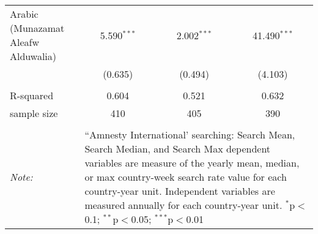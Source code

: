 \begin{table}[!htbp]
\begin{tabular}{@{\extracolsep{5pt}}lccc}
  Arabic (Munazamat Aleafw Alduwalia) & 5.590$^{***}$ & 2.002$^{***}$ & 41.490$^{***}$ \\ 
  & (0.635) & (0.494) & (4.103) \\ 
 \hline \\[-1.8ex] 
R-squared  & 0.604 & 0.521 & 0.632 \\ 
sample size  & 410 & 405 & 390 \\ 
\hline 
\hline \\[-1.8ex] 
\textit{Note:}  & \multicolumn{3}{l}{\parbox[t]{8cm}{``Amnesty International' searching: Search Mean, Search Median, and Search Max dependent variables are measure of the yearly mean, median, or max country-week search rate value for each country-year unit. Independent variables are measured annually for each country-year unit. $^{*}$p$<$0.1; $^{**}$p$<$0.05; $^{***}$p$<$0.01}} \\ 
\end{tabular} 
\end{table} 
